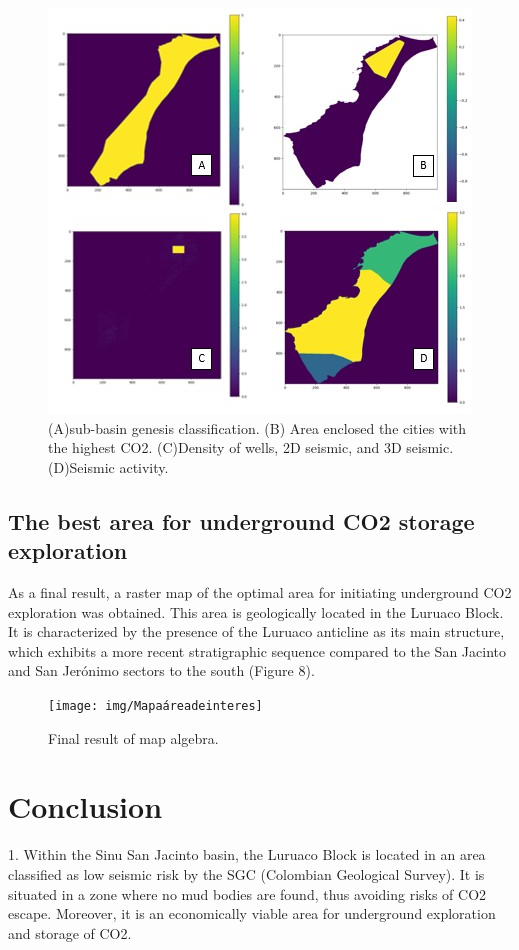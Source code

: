 \documentclass{ifacconf}
\begin{document}
\begin{figure}[h]
	\centering
	\includegraphics[width=0.7\linewidth]{img/Raster}
	\caption{ (A)sub-basin genesis classification. (B) Area enclosed the cities with the highest CO2. (C)Density of wells, 2D seismic, and 3D seismic. (D)Seismic activity.}
	\label{fig:raster}
\end{figure}

\subsection{The best area for underground CO2 storage exploration}
As a final result, a raster map of the optimal area for initiating underground CO2 exploration was obtained. This area is geologically located in the Luruaco Block. It is characterized by the presence of the Luruaco anticline as its main structure, which exhibits a more recent stratigraphic sequence compared to the San Jacinto and San Jerónimo sectors to the south (Figure 8).
\begin{figure}[h]
	\centering
	\texttt{[image: img/Mapaáreadeinteres]}
	\caption{Final result of map algebra.}
	\label{fig:mapaareadeinteres}
\end{figure}


\section{Conclusion}
1. Within the Sinu San Jacinto basin, the Luruaco Block is located in an area classified as low seismic risk by the SGC (Colombian Geological Survey). It is situated in a zone where no mud bodies are found, thus avoiding risks of CO2 escape. Moreover, it is an economically viable area for underground exploration and storage of CO2.
\end{document}
